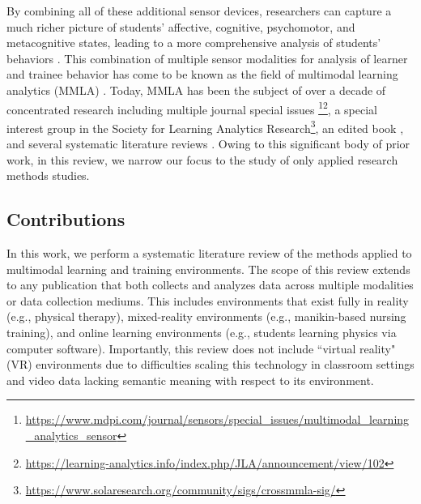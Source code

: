 \documentclass[manuscript,screen,review]{acmart}
\begin{document}
By combining all of these additional sensor devices, researchers can capture a much richer picture of students' affective, cognitive, psychomotor, and metacognitive states, leading to a more comprehensive analysis of students' behaviors \cite{blikstein2016multimodal}. This combination of multiple sensor modalities for analysis of learner and trainee behavior has come to be known as the field of multimodal learning analytics (MMLA) \cite{blikstein2013multimodal, blikstein2016multimodal, 3095923626}. Today, MMLA has been the subject of over a decade of concentrated research including multiple journal special issues \cite{BJETSpecialIssue}\footnote{\href{https://www.mdpi.com/journal/sensors/special_issues/multimodal_learning_analytics_sensor}{https://www.mdpi.com/journal/sensors/special\_issues/multimodal\_learning\_analytics\_sensor}}\footnote{\href{https://learning-analytics.info/index.php/JLA/announcement/view/102}{https://learning-analytics.info/index.php/JLA/announcement/view/102}}, a special interest group in the Society for Learning Analytics Research\footnote{\href{https://www.solaresearch.org/community/sigs/crossmmla-sig/}{https://www.solaresearch.org/community/sigs/crossmmla-sig/}}, an edited book \cite{MMLAHandbook}, and several systematic literature reviews \cite{Chango2022, Alwahaby2022, Shankar2018, Crescenzi2020, Mu2020, DiMitri2018, 3095923626}. Owing to this significant body of prior work, in this review, we narrow our focus to the study of only applied research methods studies.

\subsection{Contributions} \label{subsec:contributions}
In this work, we perform a systematic literature review of the methods applied to multimodal learning and training environments. The scope of this review extends to any publication that both collects and analyzes data across multiple modalities or data collection mediums. This includes environments that exist fully in reality (e.g., physical therapy), mixed-reality environments (e.g., manikin-based nursing training), and online learning environments (e.g., students learning physics via computer software). Importantly, this review does not include ``virtual reality" (VR) environments due to difficulties scaling this technology in classroom settings \cite{cook2019challenges} and video data lacking semantic meaning with respect to its environment.
\end{document}
